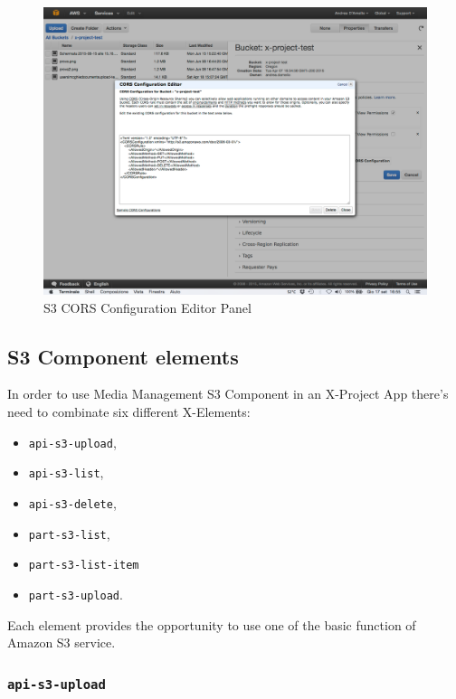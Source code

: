 \begin {figure}[h]
\graphicspath{{images/chapter_s3/}}
\includegraphics[width=\textwidth]{s3panel}
\caption{S3 CORS Configuration Editor Panel}
\end {figure}









\subsection{S3 Component elements}
\label{subsec:S3_server_elem}


In order to use Media Management S3 Component in an X-Project App there's need to combinate six different X-Elements:
\begin{itemize}

\item\texttt{api-s3-upload},
\item\texttt{api-s3-list},
\item\texttt{api-s3-delete},
\item\texttt{part-s3-list},
\item\texttt{part-s3-list-item}
\item\texttt{part-s3-upload}.

\end{itemize}

Each element provides the opportunity to use one of the basic function of Amazon S3 service. 

\subsubsection{\texttt{api-s3-upload}}
\label{api-s3-upload}


